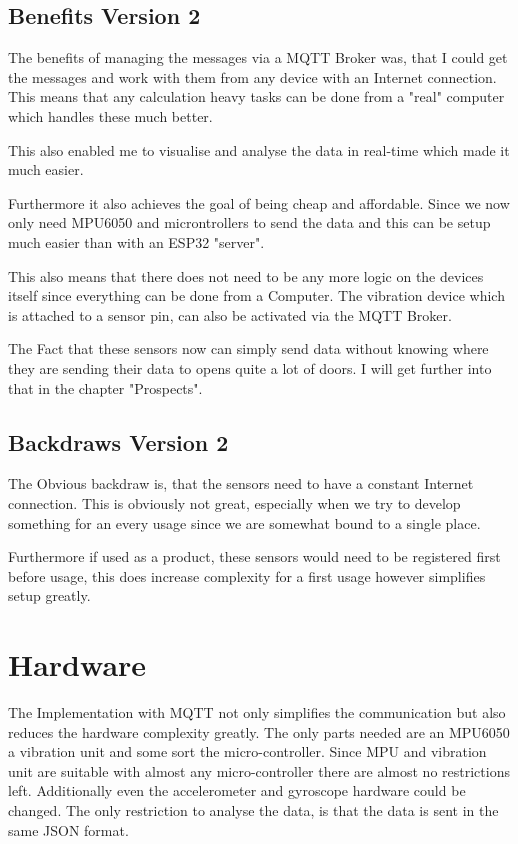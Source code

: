 \subsection{Benefits Version 2}

The benefits of managing the messages via a MQTT Broker was, that I could get the messages and work with them from any device with an Internet connection. This means that any calculation heavy tasks can be done from a "real" computer which handles these much better. 

This also enabled me to visualise and analyse the data in real-time which made it much easier. 

Furthermore it also achieves the goal of being cheap and affordable. Since we now only need MPU6050 and microntrollers to send the data and this can be setup much easier than with an ESP32 "server".

This also means that there does not need to be any more logic on the devices itself since everything can be done from a Computer. The vibration device which is attached to a sensor pin, can also be activated via the MQTT Broker. 

The Fact that these sensors now can simply send data without knowing where they are sending their data to opens quite a lot of doors. I will get further into that in the chapter "Prospects".

\subsection{Backdraws Version 2}

The Obvious backdraw is, that the sensors need to have a constant Internet connection. This is obviously not great, especially when we try to develop something for an every usage since we are somewhat bound to a single place. 

Furthermore if used as a product, these sensors would need to be registered first before usage, this does increase complexity for a first usage however simplifies setup greatly.







\section{Hardware}

The Implementation with MQTT not only simplifies the communication but also reduces the hardware complexity greatly. The only parts needed are an MPU6050 a vibration unit and some sort the micro-controller. Since MPU and vibration unit are suitable with almost any micro-controller there are almost no restrictions left. Additionally even the accelerometer and gyroscope hardware could be changed. The only restriction to analyse the data, is that the data is sent in the same JSON format. 

